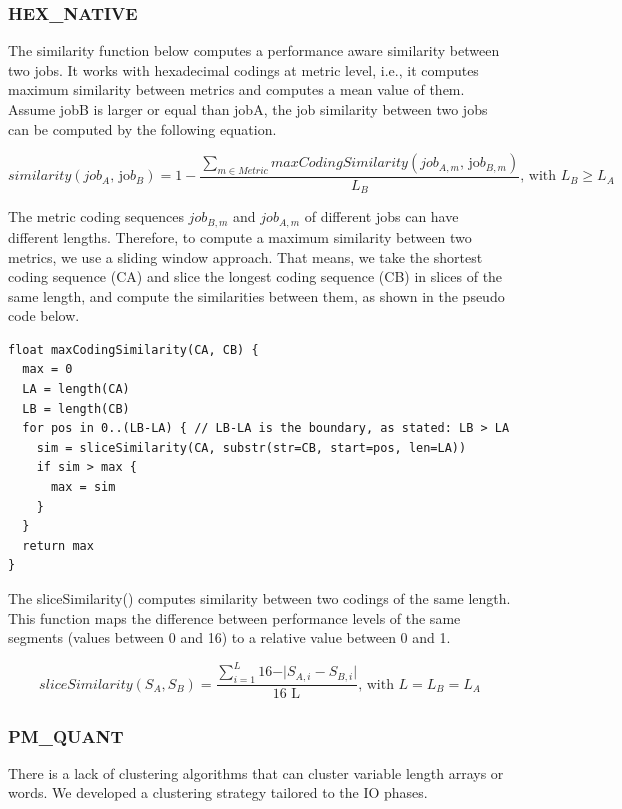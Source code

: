 \documentclass[]{llncs}
\begin{document}
\subsubsection{HEX\_NATIVE}
The similarity function below computes a performance aware similarity between two jobs.
It works with hexadecimal codings at metric level, i.e., it computes maximum similarity between metrics and computes a mean value of them.
Assume jobB is larger or equal than jobA, the job similarity between two jobs can be computed by the following equation.

\begin{equation}
similarity \left( job_{A}\text{, jo}b_{B} \right)  = 1-\frac{ \sum _{m \in Metric}^{}maxCodingSimilarity \left( job_{A,m}\text{, jo}b_{B,m} \right) }{L_{B}}\text{, with }L_{B} \geq L_{A}
\end{equation}

The metric coding sequences $job_{B,m}$ and $job_{A,m}$ of different jobs can have different lengths.
Therefore, to compute a maximum similarity between two metrics, we use a sliding window approach.
That means, we take the shortest coding sequence (CA) and slice the longest coding sequence (CB) in slices of the same length, and compute the similarities between them, as shown in the pseudo code below.

\begin{lstlisting}
float maxCodingSimilarity(CA, CB) { 
  max = 0
  LA = length(CA)
  LB = length(CB)
  for pos in 0..(LB-LA) { // LB-LA is the boundary, as stated: LB > LA
    sim = sliceSimilarity(CA, substr(str=CB, start=pos, len=LA))
    if sim > max {
      max = sim
    }
  }
  return max
}
\end{lstlisting}

The sliceSimilarity() computes similarity between two codings of the same length.
This function maps the difference between performance levels of the same segments (values between 0 and 16) to a relative value between 0 and 1.

\begin{equation}
sliceSimilarity \left( S_{A},S_{B} \right) =\frac{ \sum _{i=1}^{L_{}}16 - \vert S_{A,i}-S_{B,i} \vert }{\text{16 L}_{}}\text{, with }L=L_{B}=L_{A}
\end{equation}

\subsubsection{PM\_QUANT}
There is a lack of clustering algorithms that can cluster variable length arrays or words.
We developed a clustering strategy tailored to the IO phases.
\end{document}
